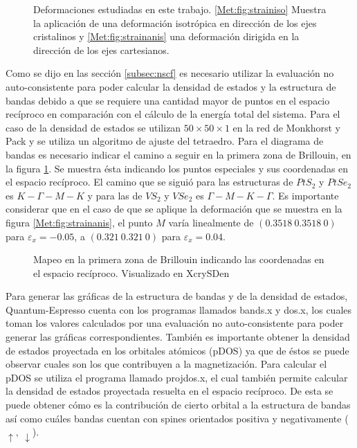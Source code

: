   \begin{figure}[hbt!]
  	\centering
     \caption[Deformaciones estudiadas.]{Deformaciones estudiadas en este trabajo. \ref{Met:fig:strainiso} Muestra la aplicaci\'on de una deformaci\'on isotr\'opica en direcci\'on de los ejes cristalinos y \ref{Met:fig:strainanis} una deformaci\'on dirigida en la direcci\'on de los ejes cartesianos.}
  \end{figure}
  \newline
  \par Como se dijo en las secci\'on \ref{subsec:nscf} es necesario utilizar la evaluaci\'on no auto-consistente para poder calcular la densidad de estados  y la estructura de bandas debido a que se requiere una cantidad mayor de puntos en el espacio rec\'iproco en comparaci\'on con el c\'alculo de la energ\'ia total del sistema. Para el caso de la densidad de estados  se utilizan $50 \times 50 \times 1 $ en la red de Monkhorst y Pack y  se utiliza un algoritmo de ajuste del tetraedro. Para el diagrama de bandas es necesario indicar el camino a seguir en la primera zona de Brillouin, en la figura \ref{Mat:fig:espacioK}. Se muestra \'esta indicando los puntos especiales y sus coordenadas en el espacio rec\'iproco. El camino que se sigui\'o para las estructuras de $PtS_2$ y $PtSe_2$ es $K-\Gamma-M-K$  y para las de $VS_2$ y $VSe_2$ es $\Gamma-M-K-\Gamma$. Es importante considerar que en el caso de que se aplique la deformaci\'on que se muestra en la figura \ref{Met:fig:strainanis}, el punto $M$ var\'ia linealmente de $(0.3518~0.3518~0)$ para $\varepsilon_x=-0.05$, a $(0.321~0.321~0)$ para $\varepsilon_x=0.04$. 
  \begin{figure}[hbt!]
  	\centering
  	\caption[Puntos especiales en la zona de Brillouin.]{Mapeo en la primera zona de Brillouin indicando las coordenadas en el espacio rec\'iproco. Visualizado en XcrySDen}
    \label{Mat:fig:espacioK}
  \end{figure}
  \newline
  \par Para  generar las gr\'aficas de la estructura de bandas y de la densidad de estados, Quantum-Espresso cuenta con los  programas llamados bands.x y dos.x, los cuales toman los valores calculados por una evaluaci\'on no auto-consistente para poder generar las gr\'aficas correspondientes. Tambi\'en es importante obtener la densidad de estados proyectada en los orbitales at\'omicos (pDOS)  ya que de \'estos se puede observar cuales son los que contribuyen a la magnetizaci\'on. Para calcular el pDOS se utiliza el programa llamado projdos.x, el cual tambi\'en permite calcular la densidad de estados proyectada resuelta en el espacio rec\'iproco. De esta se puede obtener c\'omo es la contribuci\'on de cierto orbital a la estructura de bandas as\'i como cu\'ales bandas cuentan con spines orientados positiva y negativamente ($\uparrow,~\downarrow$).
